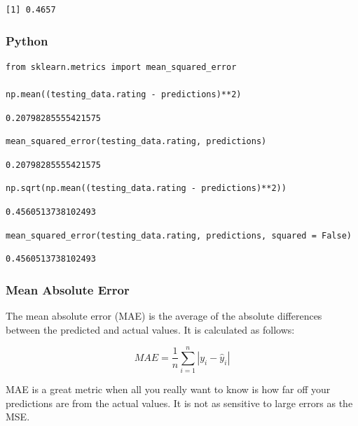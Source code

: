 \documentclass[
  letterpaper,
]{krantz}
\begin{document}
\begin{verbatim}
[1] 0.4657
\end{verbatim}

\subsubsection{Python}

\begin{verbatim}
from sklearn.metrics import mean_squared_error

np.mean((testing_data.rating - predictions)**2)
\end{verbatim}

\begin{verbatim}
0.20798285555421575
\end{verbatim}

\begin{verbatim}
mean_squared_error(testing_data.rating, predictions)
\end{verbatim}

\begin{verbatim}
0.20798285555421575
\end{verbatim}

\begin{verbatim}
np.sqrt(np.mean((testing_data.rating - predictions)**2))
\end{verbatim}

\begin{verbatim}
0.4560513738102493
\end{verbatim}

\begin{verbatim}
mean_squared_error(testing_data.rating, predictions, squared = False)
\end{verbatim}

\begin{verbatim}
0.4560513738102493
\end{verbatim}

\subsubsection{Mean Absolute Error}\label{sec-knowing-metrics-mae}

The mean absolute error (MAE) is the average of the absolute differences
between the predicted and actual values. It is calculated as follows:

\[MAE = \frac{1}{n}\sum_{i=1}^{n}|y_i - \hat{y}_i|\]

MAE is a great metric when all you really want to know is how far off
your predictions are from the actual values. It is not as sensitive to
large errors as the MSE.
\end{document}
